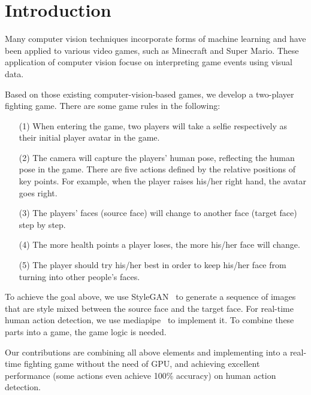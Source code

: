 \section{Introduction}

Many computer vision techniques incorporate forms of machine learning and have been applied to various video games, such as Minecraft and Super Mario. These application of computer vision focuse on interpreting game events using visual data.

Based on those existing computer-vision-based games, we develop a two-player fighting game. There are some game rules in the following:
\begin{enumerate}
    \item[(1)] When entering the game, two players will take a selfie respectively as their initial player avatar in the game.
    \item[(2)] The camera will capture the players' human pose, reflecting the human pose in the game. There are five actions defined by the relative positions of key points. For example, when the player raises his/her right hand, the avatar goes right.
    \item[(3)] The players' faces (source face) will change to another face (target face) step by step.
    \item[(4)] The more health points a player loses, the more his/her face will change. 
    \item[(5)] The player should try his/her best in order to keep his/her face from turning into other people's faces.
\end{enumerate}

To achieve the goal above, we use StyleGAN~\cite{karras2019style} to generate a sequence of images that are style mixed between the source face and the target face. For real-time human action detection, we use mediapipe~\cite{lugaresi2019mediapipe} to implement it. To combine these parts into a game, the game logic is needed. 

Our contributions are combining all above elements and implementing into a real-time fighting game without the need of GPU, and achieving excellent performance (some actions even achieve 100\% accuracy) on human action detection.

